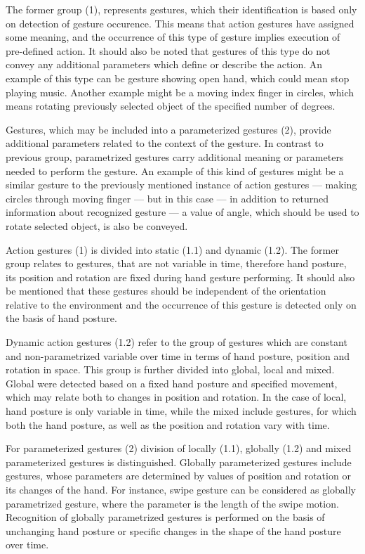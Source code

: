 The former group (1), represents gestures, which their identification is based only on detection of gesture occurence. This means that action gestures have assigned some meaning, and the occurrence of this type of gesture implies execution of pre-defined action. It should also be noted that gestures of this type do not convey any additional parameters which define or describe the action. An example of this type can be gesture showing open hand, which could mean stop playing music. Another example might be a moving index finger in circles, which means rotating previously selected object of the specified number of degrees.

Gestures, which may be included into a parameterized gestures (2), provide additional parameters related to the context of the gesture. In contrast to previous group, parametrized gestures carry additional meaning or parameters needed to perform the gesture. An example of this kind of gestures might be a similar gesture to the previously mentioned instance of action gestures --- making circles through moving finger --- but in this case --- in addition to returned information about recognized gesture --- a value of angle, which should be used to rotate selected object, is also be conveyed.

Action gestures (1) is divided into static (1.1) and dynamic (1.2). The former group relates to gestures, that are not variable in time, therefore hand posture, its position and rotation are fixed during hand gesture performing. It should also be mentioned that these gestures should be independent of the orientation relative to the environment and the occurrence of this gesture is detected only on the basis of hand posture.

Dynamic action gestures (1.2) refer to the group of gestures which are constant and non-parametrized variable over time in terms of hand posture, position and rotation in space. This group is further divided into global, local and mixed. Global were detected based on a fixed hand posture and specified movement, which may relate both to changes in position and rotation. In the case of local, hand posture is only variable in time, while the mixed include gestures, for which both the hand posture, as well as the position and rotation vary with time. 

For parameterized gestures (2) division of locally (1.1), globally (1.2) and mixed parameterized gestures is distinguished. Globally parameterized gestures include gestures, whose parameters are determined by values of position and rotation or its changes of the hand. For instance, swipe gesture can be considered as globally parametrized gesture, where the parameter is the length of the swipe motion. Recognition of globally parametrized gestures is performed on the basis of unchanging hand posture or specific changes in the shape of the hand posture over time.

